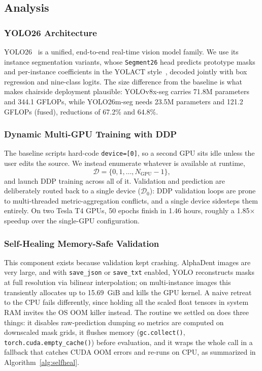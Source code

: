 \documentclass[conference]{IEEEtran}
\begin{document}
\subsection{Analysis}
\subsubsection{YOLO26 Architecture}
YOLO26~\cite{jocher2026yolo26} is a unified, end-to-end real-time vision model family. We use its instance segmentation variants, whose \texttt{Segment26} head predicts prototype masks and per-instance coefficients in the YOLACT style~\cite{bolya2019yolact}, decoded jointly with box regression and nine-class logits. The size difference from the baseline is what makes chairside deployment plausible: YOLOv8x-seg carries 71.8M parameters and 344.1 GFLOPs, while YOLO26m-seg needs 23.5M parameters and 121.2 GFLOPs (fused), reductions of 67.2\% and 64.8\%.

\subsubsection{Dynamic Multi-GPU Training with DDP}
The baseline scripts hard-code \texttt{device=[0]}, so a second GPU sits idle unless the user edits the source. We instead enumerate whatever is available at runtime,
\begin{equation}
\mathcal{D} = \{0, 1, \dots, N_{\mathrm{GPU}}-1\},
\end{equation}
and launch DDP training across all of it. Validation and prediction are deliberately routed back to a single device ($\mathcal{D}_0$): DDP validation loops are prone to multi-threaded metric-aggregation conflicts, and a single device sidesteps them entirely. On two Tesla T4 GPUs, 50 epochs finish in 1.46 hours, roughly a 1.85$\times$ speedup over the single-GPU configuration.

\subsubsection{Self-Healing Memory-Safe Validation}
This component exists because validation kept crashing. AlphaDent images are very large, and with \texttt{save\_json} or \texttt{save\_txt} enabled, YOLO reconstructs masks at full resolution via bilinear interpolation; on multi-instance images this transiently allocates up to 15.69~GiB and kills the GPU kernel. A naive retreat to the CPU fails differently, since holding all the scaled float tensors in system RAM invites the OS OOM killer instead. The routine we settled on does three things: it disables raw-prediction dumping so metrics are computed on downscaled mask grids, it flushes memory (\texttt{gc.collect()}, \texttt{torch.cuda.empty\_cache()}) before evaluation, and it wraps the whole call in a fallback that catches CUDA OOM errors and re-runs on CPU, as summarized in Algorithm~\ref{alg:selfheal}.
\end{document}
